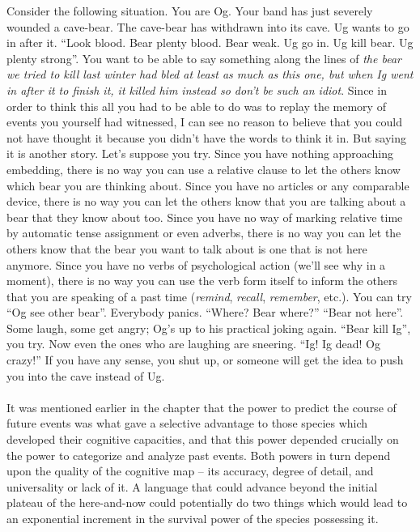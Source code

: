 Consider the following situation. You are Og. Your band has just severely wounded a cave-bear. The cave-bear has withdrawn into its cave. Ug wants to go in after it. ``Look blood. Bear plenty blood. Bear weak. Ug go in. Ug kill bear. Ug plenty strong''. You want to be able to say something along the lines of \textit{the bear we tried to kill last winter had bled at least as much as this one, but when Ig went in after it to finish it, it killed him instead so don't be such an idiot}. Since in order to think this all you had to be able to do was to replay the memory of events you yourself had witnessed, I can see no reason to believe that you could not have thought it because you didn't have the words to think it in. But saying it is another story. Let's suppose you try. Since you have nothing approaching embedding, there is no way you can use a relative clause to let the others know which bear you are thinking about. Since you have no articles or any comparable device, there is no way you can let the others know that you are talking about a bear that they know about too. Since you have no way of marking relative time by automatic tense assignment or even adverbs, there is no way you can let the others know that the bear you want to talk about is one that is not here anymore. Since you have no verbs of psychological action (we'll see why in a moment), there is no way you can use the verb form itself to inform the others that you are speaking of a past time (\textit{remind}, \textit{recall}, \textit{remember}, etc.). You can try ``Og see other bear''. Everybody panics. ``Where? Bear where?'' ``Bear not here''. Some laugh, some get angry; Og's up to his practical joking again. ``Bear kill Ig'', you try. Now even the ones who are laughing are sneering. ``Ig! Ig dead! Og crazy!'' If you have any sense, you shut up, or someone will get the idea to push you into the cave instead of Ug.\\\\

It was mentioned earlier in the chapter that the power to predict the course of future events was what gave a selective advantage to those species which developed their cognitive capacities, and that this power depended crucially on the power to categorize and analyze past events. Both powers in turn depend upon the quality of the cognitive map --
its accuracy, degree of detail, and universality or lack of it. A language that could advance beyond the initial plateau of the here-and-now could potentially do two things which would lead to an exponential increment in the survival power of the species possessing it.

